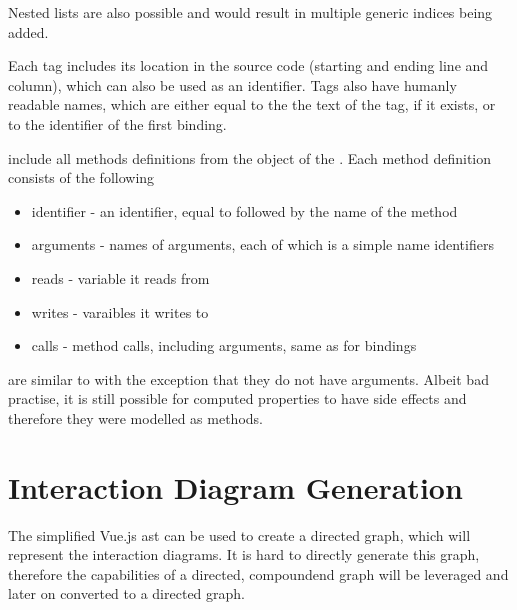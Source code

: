 Nested lists are also possible and would result in multiple generic indices being added.

Each tag includes its location in the source code (starting and ending line and column), which can also be used as an identifier. Tags also have humanly readable names, which are either equal to the the text of the tag, if it exists, or to the identifier of the first binding. 

 include all methods definitions from the  object of the . Each method definition consists of the following
\begin{itemize}
    \item identifier - an identifier, equal to  followed by the name of the method
    \item arguments - names of arguments, each of which is a simple name identifiers
    \item reads - variable it reads from
    \item writes - varaibles it writes to
    \item calls - method calls, including arguments, same as for bindings 
\end{itemize}

 are similar to  with the exception that they do not have arguments. Albeit bad practise, it is still possible for computed properties to have side effects and therefore they were modelled as methods.

\section{Interaction Diagram Generation}

The simplified Vue.js \gls{ast} can be used to create a directed graph, which will represent the interaction diagrams. It is hard to directly generate this graph, therefore the capabilities of a directed, compoundend graph will be leveraged and later on converted to a directed graph. 

